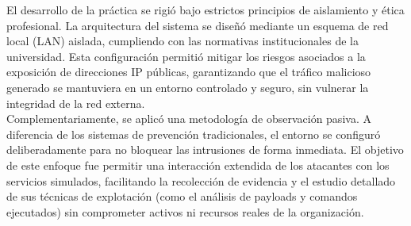 El desarrollo de la práctica se rigió bajo estrictos principios de aislamiento y ética profesional. La arquitectura del sistema se diseñó mediante un esquema de red local (LAN) aislada, cumpliendo con las normativas institucionales de la universidad. Esta configuración permitió mitigar los riesgos asociados a la exposición de direcciones IP públicas, garantizando que el tráfico malicioso generado se mantuviera en un entorno controlado y seguro, sin vulnerar la integridad de la red externa.\\
Complementariamente, se aplicó una metodología de observación pasiva. A diferencia de los sistemas de prevención tradicionales, el entorno se configuró deliberadamente para no bloquear las intrusiones de forma inmediata. El objetivo de este enfoque fue permitir una interacción extendida de los atacantes con los servicios simulados, facilitando la recolección de evidencia y el estudio detallado de sus técnicas de explotación (como el análisis de payloads y comandos ejecutados) sin comprometer activos ni recursos reales de la organización.